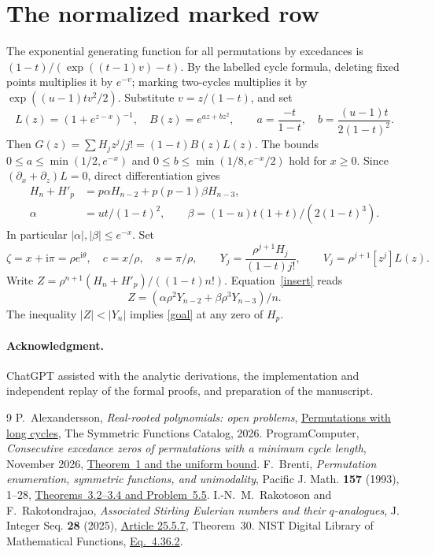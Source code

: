 \documentclass[11pt]{article}
\newcommand{\ii}{\mathrm{i}}
\begin{document}
\section{The normalized marked row}
The exponential generating function for all permutations by excedances is \((1-t)/(\exp((t-1)v)-t)\). By the labelled cycle formula, deleting fixed points multiplies it by \(e^{-v}\); marking two-cycles multiplies it by \(\exp((u-1)tv^2/2)\). Substitute \(v=z/(1-t)\), and set
\[
 L(z)=(1+e^{z-x})^{-1},\quad B(z)=e^{az+bz^2},\qquad
 a=\frac{-t}{1-t},\quad b=\frac{(u-1)t}{2(1-t)^2}.
\]
Then \(G(z)=\sum H_j z^j/j!=(1-t)B(z)L(z)\).
The bounds \(0\le a\le\min(1/2,e^{-x})\) and \(0\le b\le\min(1/8,e^{-x}/2)\) hold for \(x\ge0\). Since \((\partial_x+\partial_z)L=0\), direct differentiation gives
\begin{align}
 H_n+H'_p&=p\alpha H_{n-2}+p(p-1)\beta H_{n-3},\label{insert}\\
 \alpha&=ut/(1-t)^2,\qquad \beta=(1-u)t(1+t)/(2(1-t)^3).\nonumber
\end{align}
In particular \(|\alpha|,|\beta|\le e^{-x}\). Set
\[
 \zeta=x+\ii\pi=\rho e^{\ii\theta},\quad c=x/\rho,\quad s=\pi/\rho,\qquad
 Y_j=\frac{\rho^{j+1}H_j}{(1-t)j!},\qquad V_j=\rho^{j+1}[z^j]L(z).
\]
Write \(Z=\rho^{n+1}(H_n+H'_p)/((1-t)n!)\). Equation~\eqref{insert} reads
\[
 Z=(\alpha\rho^2Y_{n-2}+\beta\rho^3Y_{n-3})/n .
\]
The inequality \(|Z|<|Y_n|\) implies \eqref{goal} at any zero of \(H_p\).





\paragraph{Acknowledgment.}
ChatGPT assisted with the analytic derivations, the implementation and independent replay of the formal proofs, and preparation of the manuscript.
\begin{thebibliography}{9}
P.~Alexandersson, \emph{Real-rooted polynomials: open problems},
\href{https://www.symmetricfunctions.com/realRootedOpenProblems.htm\#permutations-with-long-cycles}{Permutations with long cycles},
The Symmetric Functions Catalog, 2026.
ProgramComputer, \emph{Consecutive excedance zeros of permutations with a minimum cycle length}, November 2026,
\href{https://github.com/ProgramComputer/open-math-research/blob/4da48b72ed8f92f96c2faf60e2d63d253b3b507a/topics/long-cycle-excedances/paper.tex}{Theorem~1 and the uniform bound}.
F.~Brenti, \emph{Permutation enumeration, symmetric functions, and
unimodality}, Pacific J. Math. \textbf{157} (1993), 1--28,
\href{https://msp.org/pjm/1993/157-1/pjm-v157-n1-p01-s.pdf}{Theorems~3.2--3.4 and Problem~5.5}.
I.-N.~M.~Rakotoson and F.~Rakotondrajao,
\emph{Associated Stirling Eulerian numbers and their \(q\)-analogues},
J. Integer Seq. \textbf{28} (2025),
\href{https://cs.uwaterloo.ca/journals/JIS/VOL28/Rakotoson/rakoto12.html}{Article 25.5.7},
Theorem~30.
NIST Digital Library of Mathematical Functions,
\href{https://dlmf.nist.gov/4.36.E2}{Eq.~4.36.2}.
\end{thebibliography}
\end{document}
